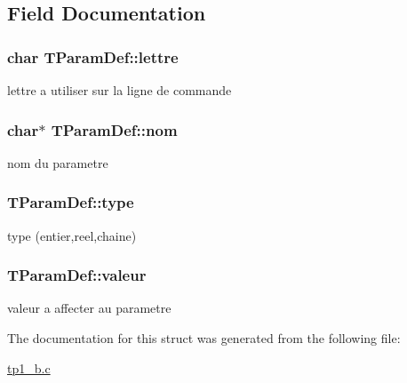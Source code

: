 \subsection{Field Documentation}
\hypertarget{structTParamDef_a66254f6368c5542d3f14afdd1ea1e621}{
\subsubsection[{lettre}]{\setlength{\rightskip}{0pt plus 5cm}char T\-Param\-Def\-::lettre}}\label{structTParamDef_a66254f6368c5542d3f14afdd1ea1e621}
lettre a utiliser sur la ligne de commande \hypertarget{structTParamDef_afa78db012abc7fecd18c60d6154e04f8}{
\subsubsection[{nom}]{\setlength{\rightskip}{0pt plus 5cm}char$\ast$ T\-Param\-Def\-::nom}}\label{structTParamDef_afa78db012abc7fecd18c60d6154e04f8}
nom du parametre \hypertarget{structTParamDef_aaa8c69f39c6dd02a968dc15044810327}{
\subsubsection[{type}]{ T\-Param\-Def\-::type}}\label{structTParamDef_aaa8c69f39c6dd02a968dc15044810327}
type (entier,reel,chaine) \hypertarget{structTParamDef_a3f5cbf75e393d35bb230dfe293f7c7ba}{
\subsubsection[{valeur}]{ T\-Param\-Def\-::valeur}}\label{structTParamDef_a3f5cbf75e393d35bb230dfe293f7c7ba}
valeur a affecter au parametre 

The documentation for this struct was generated from the following file\-:\begin{DoxyCompactItemize}
\item 
\hyperlink{tp1__b_8c}{tp1\-\_\-b.\-c}\end{DoxyCompactItemize}
